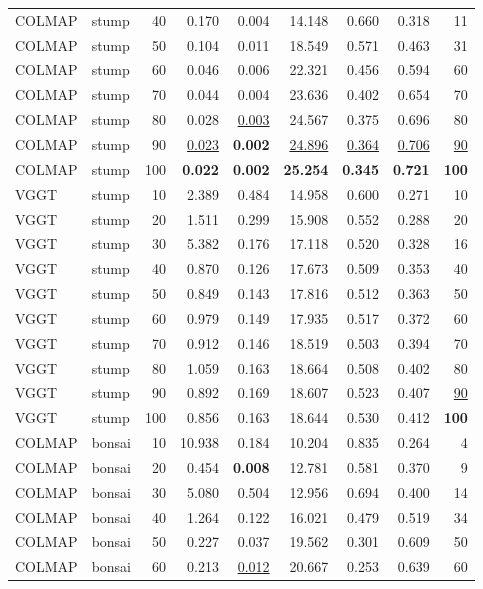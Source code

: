 \begin{table}[H]
\begin{tabular}{llrrrrrrr}
COLMAP & stump & 40 & 0.170 & 0.004 & 14.148 & 0.660 & 0.318 & 11 \\
COLMAP & stump & 50 & 0.104 & 0.011 & 18.549 & 0.571 & 0.463 & 31 \\
COLMAP & stump & 60 & 0.046 & 0.006 & 22.321 & 0.456 & 0.594 & 60 \\
COLMAP & stump & 70 & 0.044 & 0.004 & 23.636 & 0.402 & 0.654 & 70 \\
COLMAP & stump & 80 & 0.028 & \underline{0.003} & 24.567 & 0.375 & 0.696 & 80 \\
COLMAP & stump & 90 & \underline{0.023} & \textbf{0.002} & \underline{24.896} & \underline{0.364} & \underline{0.706} & \underline{90} \\
COLMAP & stump & 100 & \textbf{0.022} & \textbf{0.002} & \textbf{25.254} & \textbf{0.345} & \textbf{0.721} & \textbf{100} \\
VGGT & stump & 10 & 2.389 & 0.484 & 14.958 & 0.600 & 0.271 & 10 \\
VGGT & stump & 20 & 1.511 & 0.299 & 15.908 & 0.552 & 0.288 & 20 \\
VGGT & stump & 30 & 5.382 & 0.176 & 17.118 & 0.520 & 0.328 & 16 \\
VGGT & stump & 40 & 0.870 & 0.126 & 17.673 & 0.509 & 0.353 & 40 \\
VGGT & stump & 50 & 0.849 & 0.143 & 17.816 & 0.512 & 0.363 & 50 \\
VGGT & stump & 60 & 0.979 & 0.149 & 17.935 & 0.517 & 0.372 & 60 \\
VGGT & stump & 70 & 0.912 & 0.146 & 18.519 & 0.503 & 0.394 & 70 \\
VGGT & stump & 80 & 1.059 & 0.163 & 18.664 & 0.508 & 0.402 & 80 \\
VGGT & stump & 90 & 0.892 & 0.169 & 18.607 & 0.523 & 0.407 & \underline{90} \\
VGGT & stump & 100 & 0.856 & 0.163 & 18.644 & 0.530 & 0.412 & \textbf{100} \\
\midrule
COLMAP & bonsai & 10 & 10.938 & 0.184 & 10.204 & 0.835 & 0.264 & 4 \\
COLMAP & bonsai & 20 & 0.454 & \textbf{0.008} & 12.781 & 0.581 & 0.370 & 9 \\
COLMAP & bonsai & 30 & 5.080 & 0.504 & 12.956 & 0.694 & 0.400 & 14 \\
COLMAP & bonsai & 40 & 1.264 & 0.122 & 16.021 & 0.479 & 0.519 & 34 \\
COLMAP & bonsai & 50 & 0.227 & 0.037 & 19.562 & 0.301 & 0.609 & 50 \\
COLMAP & bonsai & 60 & 0.213 & \underline{0.012} & 20.667 & 0.253 & 0.639 & 60 \\

\end{tabular}
\end{table}
